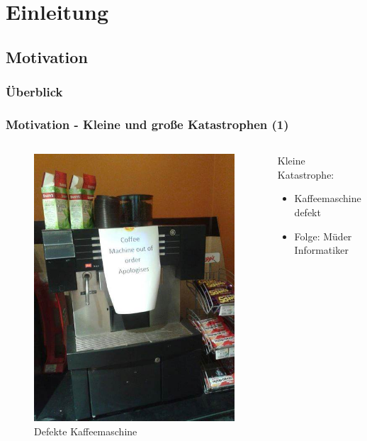 \section{Einleitung}
\subsection{Motivation}
%
%
\begin{frame}
	\frametitle{Überblick}
	\tableofcontents[currentsubsection]
\end{frame}
%
%
\begin{frame}
		\frametitle{Motivation - Kleine und große Katastrophen (1)}
	\begin{columns}
		\begin{column}{0.48\textwidth}
			\begin{figure}
				\includegraphics[scale=0.36]{grafiken/broken2}		
				\caption{Defekte Kaffeemaschine
					\footnotemark	
				}		
			\end{figure}
		\end{column}
		\begin{column}{0.48\textwidth}
			Kleine Katastrophe:
			\begin{itemize}
				\item Kaffeemaschine defekt
				\item Folge: Müder Informatiker
			\end{itemize}
		\end{column}		
	\end{columns}
\end{frame}
